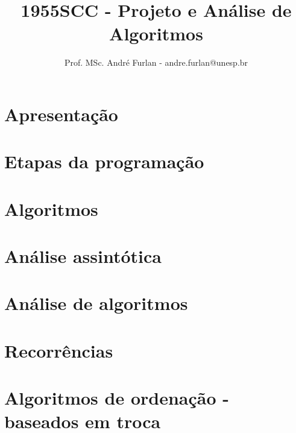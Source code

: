 

\title{1955SCC - Projeto e Análise de Algoritmos}


\author{Prof. MSc. André Furlan - andre.furlan@unesp.br}

\date{\the\year}

\newcommand{\apontar}[2]{
	\underset{\underset{#1}{\uparrow}}{\mathbf{#2}}
}


	
	\frame{\titlepage}
	
	\section{Apresentação}
		
		
	\section{Etapas da programação}
		

	\section{Algoritmos}
		
		
	\section{Análise assintótica}
		
		
	\section{Análise de algoritmos}
		
		
	\section{Recorrências}
		
		
	\section{Algoritmos de ordenação - baseados em troca}
		
		
